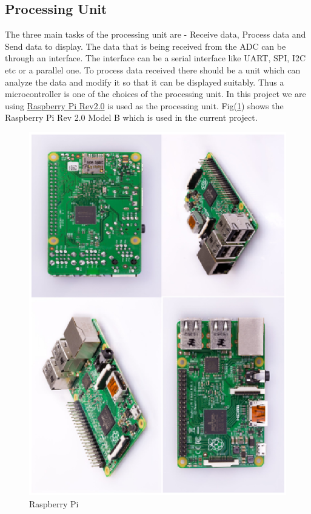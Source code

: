\documentclass[12pt, a4paper, twoside]{article}
\begin{document}
\subsection{Processing Unit}
    The three main tasks of the processing unit are - Receive data, Process data and Send data to display. The data that is being received from the ADC can be through an interface. The interface can be a serial interface like UART, SPI, I2C etc or a parallel one. To process data received there should be a unit which can analyze the data and modify it so that it can be displayed suitably. Thus a microcontroller is one of the choices of the processing unit. In this project we are using \href{https://www.raspberrypi.org/}{Raspberry Pi Rev2.0}\cite{bib_raspberrypi}  is used as the processing unit. Fig(\ref{fig_rpi}) shows the Raspberry Pi Rev 2.0 Model B which is used in the current project.
 
\begin{figure}[ht]
    \centering
    \includegraphics[scale=0.75]{./fig/rpi.ps}
    \caption{Raspberry Pi}
    \label{fig_rpi}
\end{figure}
\end{document}
